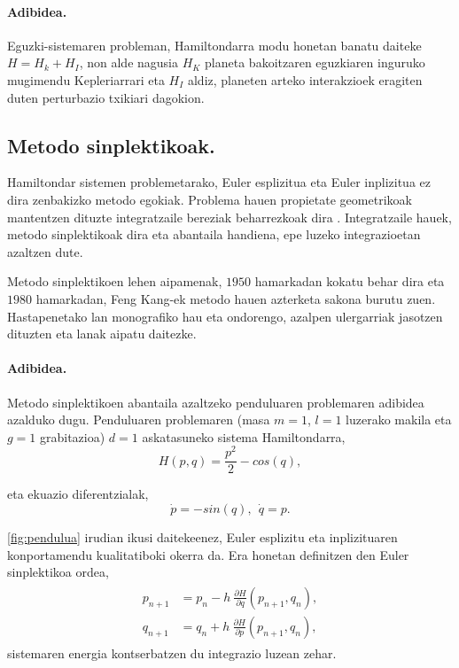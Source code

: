 \paragraph*{Adibidea.} Eguzki-sistemaren probleman, Hamiltondarra modu honetan banatu daiteke $H=H_k+H_I$, non alde nagusia $H_K$ planeta bakoitzaren eguzkiaren inguruko mugimendu Kepleriarrari eta $H_I$ aldiz, planeten arteko interakzioek eragiten duten perturbazio txikiari dagokion.   

\subsection{Metodo sinplektikoak.}

Hamiltondar sistemen problemetarako, Euler esplizitua eta Euler inplizitua ez dira zenbakizko metodo egokiak. Problema hauen propietate geometrikoak mantentzen dituzte integratzaile bereziak beharrezkoak dira \cite{JMSanz-Serna1994}. Integratzaile hauek, metodo sinplektikoak dira eta abantaila handiena, epe luzeko integrazioetan azaltzen dute.

Metodo sinplektikoen lehen aipamenak, $1950$ hamarkadan kokatu behar dira eta $1980$ hamarkadan, Feng Kang-ek metodo hauen azterketa sakona burutu zuen. Hastapenetako lan monografiko hau \cite{JMSanz-Serna1994} eta ondorengo, azalpen ulergarriak jasotzen dituzten \cite{Hairer2006} eta  \cite{Leimkuhler2004} lanak aipatu daitezke.    

\paragraph*{Adibidea.} Metodo sinplektikoen abantaila azaltzeko penduluaren problemaren adibidea azalduko dugu. Penduluaren problemaren (masa $m=1$, $l=1$ luzerako makila eta $g=1$ grabitazioa) $d=1$ askatasuneko sistema Hamiltondarra,
\begin{equation}
H(p,q)= \frac{p^2}{2}- cos (q),
\end{equation}

eta ekuazio diferentzialak,
\begin{equation}
\label{eq:pendulua}
\dot{p}= -sin (q), \ \ \dot{q}=p.
\end{equation}

\ref{fig:pendulua} irudian ikusi daitekeenez, Euler esplizitu eta inplizituaren konportamendu kualitatiboki okerra da. Era honetan definitzen den Euler sinplektikoa ordea, 
\begin{align}
\label{eq:eulersin}
\begin{split}
p_{n+1} & =p_n-h \ \frac{\partial H }{\partial q} (p_{n+1},q_{n}), \\
q_{n+1} & =q_n+h \ \frac{\partial H}{\partial p} (p_{n+1},q_{n}),
\end{split}
\end{align}
sistemaren energia kontserbatzen du integrazio luzean zehar.


